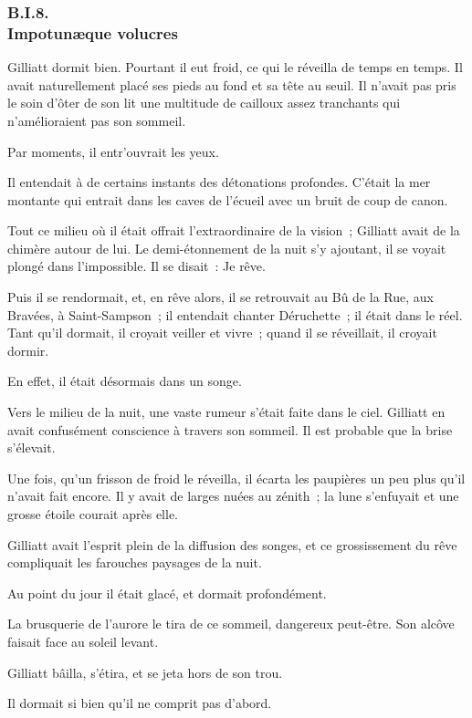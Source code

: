 \documentclass[french,twoside]{book} %
\begin{document}
 \subsubsection[{B.I.8. Impotunæque volucres}]{B.I.8. \\
Impotunæque volucres}
\noindent Gilliatt dormit bien. Pourtant il eut froid, ce qui le réveilla de temps en temps. Il avait naturellement placé ses pieds au fond et sa tête au seuil. Il n’avait pas pris le soin d’ôter de son lit une multitude de cailloux assez tranchants qui n’amélioraient pas son sommeil.\par
Par moments, il entr’ouvrait les yeux.\par
Il entendait à de certains instants des détonations profondes. C’était la mer montante qui entrait dans les caves de l’écueil avec un bruit de coup de canon.\par
Tout ce milieu où il était offrait l’extraordinaire de la vision ; Gilliatt avait de la chimère autour de lui. Le demi-étonnement de la nuit s’y ajoutant, il se voyait plongé dans l’impossible. Il se disait : Je rêve.\par
Puis il se rendormait, et, en rêve alors, il se retrouvait au Bû de la Rue, aux Bravées, à Saint-Sampson ; il entendait chanter Déruchette ; il était dans le réel. Tant qu’il dormait, il croyait veiller et vivre ; quand il se réveillait, il croyait dormir.\par
 En effet, il était désormais dans un songe.\par
Vers le milieu de la nuit, une vaste rumeur s’était faite dans le ciel. Gilliatt en avait confusément conscience à travers son sommeil. Il est probable que la brise s’élevait.\par
Une fois, qu’un frisson de froid le réveilla, il écarta les paupières un peu plus qu’il n’avait fait encore. Il y avait de larges nuées au zénith ; la lune s’enfuyait et une grosse étoile courait après elle.\par
Gilliatt avait l’esprit plein de la diffusion des songes, et ce grossissement du rêve compliquait les farouches paysages de la nuit.\par
Au point du jour il était glacé, et dormait profondément.\par
La brusquerie de l’aurore le tira de ce sommeil, dangereux peut-être. Son alcôve faisait face au soleil levant.\par
Gilliatt bâilla, s’étira, et se jeta hors de son trou.\par
Il dormait si bien qu’il ne comprit pas d’abord.\par
\end{document}
